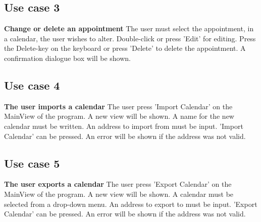 \subsection{Use case 3}
\textbf{Change or delete an appointment}
The user must select the appointment, in a calendar, the user wishes to alter.
Double-click or press 'Edit' for editing.
Press the Delete-key on the keyboard or press 'Delete' to delete the appointment. A confirmation dialogue box will be shown.

\subsection{Use case 4}
\textbf{The user imports a calendar}
The user press 'Import Calendar' on the MainView of the program.
A new view will be shown.
A name for the new calendar must be written.
An address to import from must be input.
'Import Calendar' can be pressed. An error will be shown if the address was not valid.

\subsection{Use case 5}
\textbf{The user exports a calendar}
The user press 'Export Calendar' on the MainView of the program.
A new view will be shown.
A calendar must be selected from a drop-down menu.
An address to export to must be input.
'Export Calendar' can be pressed. An error will be shown if the address was not valid.

\newpage

